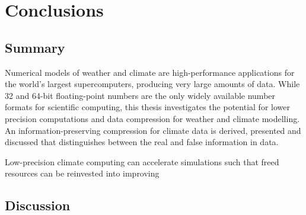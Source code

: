 \chapter{Conclusions}
\label{chap:conclusions}
\section{Summary}

Numerical models of weather and climate are high-performance applications for the world's largest supercomputers, producing very large amounts of data. 
While 32 and 64-bit floating-point numbers are the only widely available number formats for scientific computing, this thesis investigates the potential
for lower precision computations and data compression for weather and climate modelling. An information-preserving compression for climate data
is derived, presented and discussed that distinguishes between the real and false information in data.



Low-precision climate computing can accelerate simulations
such that freed resources can be reinvested into improving 


\section{Discussion}